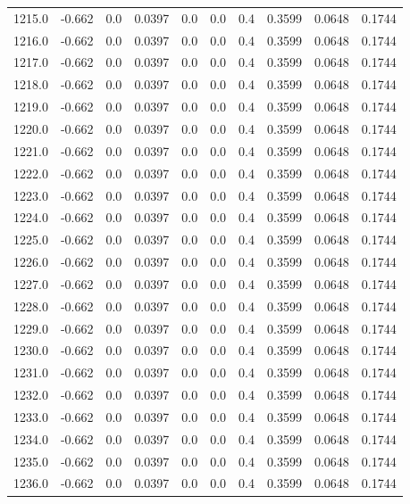 \begin{longtable}{lrrrrrrrrr}
1215.0 & -0.662 & 0.0 & 0.0397 & 0.0 & 0.0 & 0.4 & 0.3599 & 0.0648 & 0.1744 \\
1216.0 & -0.662 & 0.0 & 0.0397 & 0.0 & 0.0 & 0.4 & 0.3599 & 0.0648 & 0.1744 \\
1217.0 & -0.662 & 0.0 & 0.0397 & 0.0 & 0.0 & 0.4 & 0.3599 & 0.0648 & 0.1744 \\
1218.0 & -0.662 & 0.0 & 0.0397 & 0.0 & 0.0 & 0.4 & 0.3599 & 0.0648 & 0.1744 \\
1219.0 & -0.662 & 0.0 & 0.0397 & 0.0 & 0.0 & 0.4 & 0.3599 & 0.0648 & 0.1744 \\
1220.0 & -0.662 & 0.0 & 0.0397 & 0.0 & 0.0 & 0.4 & 0.3599 & 0.0648 & 0.1744 \\
1221.0 & -0.662 & 0.0 & 0.0397 & 0.0 & 0.0 & 0.4 & 0.3599 & 0.0648 & 0.1744 \\
1222.0 & -0.662 & 0.0 & 0.0397 & 0.0 & 0.0 & 0.4 & 0.3599 & 0.0648 & 0.1744 \\
1223.0 & -0.662 & 0.0 & 0.0397 & 0.0 & 0.0 & 0.4 & 0.3599 & 0.0648 & 0.1744 \\
1224.0 & -0.662 & 0.0 & 0.0397 & 0.0 & 0.0 & 0.4 & 0.3599 & 0.0648 & 0.1744 \\
1225.0 & -0.662 & 0.0 & 0.0397 & 0.0 & 0.0 & 0.4 & 0.3599 & 0.0648 & 0.1744 \\
1226.0 & -0.662 & 0.0 & 0.0397 & 0.0 & 0.0 & 0.4 & 0.3599 & 0.0648 & 0.1744 \\
1227.0 & -0.662 & 0.0 & 0.0397 & 0.0 & 0.0 & 0.4 & 0.3599 & 0.0648 & 0.1744 \\
1228.0 & -0.662 & 0.0 & 0.0397 & 0.0 & 0.0 & 0.4 & 0.3599 & 0.0648 & 0.1744 \\
1229.0 & -0.662 & 0.0 & 0.0397 & 0.0 & 0.0 & 0.4 & 0.3599 & 0.0648 & 0.1744 \\
1230.0 & -0.662 & 0.0 & 0.0397 & 0.0 & 0.0 & 0.4 & 0.3599 & 0.0648 & 0.1744 \\
1231.0 & -0.662 & 0.0 & 0.0397 & 0.0 & 0.0 & 0.4 & 0.3599 & 0.0648 & 0.1744 \\
1232.0 & -0.662 & 0.0 & 0.0397 & 0.0 & 0.0 & 0.4 & 0.3599 & 0.0648 & 0.1744 \\
1233.0 & -0.662 & 0.0 & 0.0397 & 0.0 & 0.0 & 0.4 & 0.3599 & 0.0648 & 0.1744 \\
1234.0 & -0.662 & 0.0 & 0.0397 & 0.0 & 0.0 & 0.4 & 0.3599 & 0.0648 & 0.1744 \\
1235.0 & -0.662 & 0.0 & 0.0397 & 0.0 & 0.0 & 0.4 & 0.3599 & 0.0648 & 0.1744 \\
1236.0 & -0.662 & 0.0 & 0.0397 & 0.0 & 0.0 & 0.4 & 0.3599 & 0.0648 & 0.1744 \\

\end{longtable}

